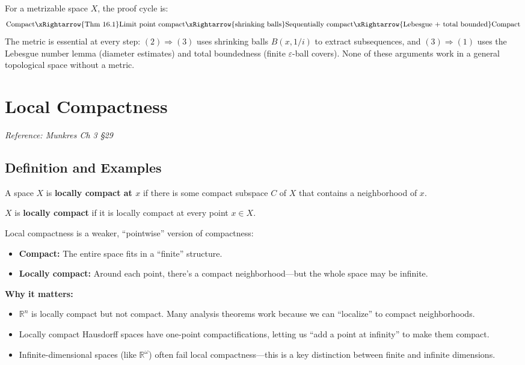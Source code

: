 \documentclass[11pt]{report}
\begin{document}
\begin{rembox}
For a metrizable space $X$, the proof cycle is:
\[
\text{Compact} \xRightarrow{\text{Thm 16.1}} \text{Limit point compact} \xRightarrow{\text{shrinking balls}} \text{Sequentially compact} \xRightarrow{\text{Lebesgue + total bounded}} \text{Compact}
\]
The metric is essential at every step: $(2) \Rightarrow (3)$ uses shrinking balls $B(x, 1/i)$ to extract subsequences, and $(3) \Rightarrow (1)$ uses the Lebesgue number lemma (diameter estimates) and total boundedness (finite $\varepsilon$-ball covers). None of these arguments work in a general topological space without a metric.
\end{rembox}

\section{Local Compactness}

\textit{Reference: Munkres Ch 3 \S 29}

\subsection{Definition and Examples}

\begin{defbox}
A space $X$ is \textbf{locally compact at $x$} if there is some compact subspace $C$ of $X$ that contains a neighborhood of $x$.

$X$ is \textbf{locally compact} if it is locally compact at every point $x \in X$.
\end{defbox}

\begin{rembox}
Local compactness is a weaker, ``pointwise'' version of compactness:
\begin{itemize}
    \item \textbf{Compact:} The entire space fits in a ``finite'' structure.
    \item \textbf{Locally compact:} Around each point, there's a compact neighborhood---but the whole space may be infinite.
\end{itemize}

\textbf{Why it matters:}
\begin{itemize}
    \item $\mathbb{R}^n$ is locally compact but not compact. Many analysis theorems work because we can ``localize'' to compact neighborhoods.
    \item Locally compact Hausdorff spaces have one-point compactifications, letting us ``add a point at infinity'' to make them compact.
    \item Infinite-dimensional spaces (like $\mathbb{R}^\omega$) often fail local compactness---this is a key distinction between finite and infinite dimensions.
\end{itemize}
\end{rembox}
\end{document}
